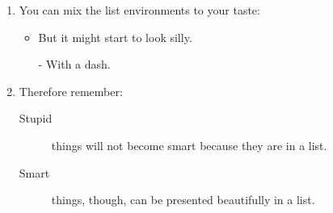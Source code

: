 \documentclass[twoside,a4paper,10pt]{article}
\begin{document}
\begin{enumerate}
\item You can mix the list environments to your taste:
  \begin{itemize}
   \item But it might start to look silly.
   \item[-] With a dash.
 \end{itemize}
\item Therefore remember:
\begin{description}
   \item[Stupid] things will not become smart because they are in a list.
   \item[Smart] things, though, can be presented beautifully in a list.
\end{description}
\end{enumerate}
\end{document}
